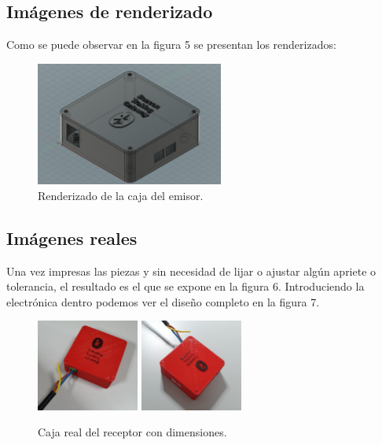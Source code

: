 \documentclass[paper=a4, fontsize=11pt,twoside]{scrartcl}
\begin{document}
    \subsection{Imágenes de renderizado}
        Como se puede observar en la figura 5 se presentan los renderizados:
        \begin{center}
            \begin{figure}[h]
                \centering
                \includegraphics[width=0.55\textwidth]{../mechanical_master.PNG}
                \caption{Renderizado de la caja del emisor.}
                \label{fig:mesh1}
            \end{figure}
        \end{center}
        \paragraph{}

    \subsection{Imágenes reales}
        Una vez impresas las piezas y sin necesidad de lijar o ajustar algún apriete o tolerancia,
        el resultado es el que se expone en la figura 6.
        Introduciendo la electrónica dentro podemos ver el diseño completo en la figura 7.
        \begin{center}
            \begin{figure}[h]
                \centering
                \includegraphics[width=0.3\textwidth]{../3d_master_1.jpeg}
                \includegraphics[width=0.3\textwidth]{../3d_master_2.jpeg}
                \caption{Caja real del receptor con dimensiones.}
                \label{fig:mesh1}
            \end{figure}
        \end{center}
\end{document}
